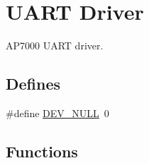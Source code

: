 \hypertarget{group___u_a_r_t___d_r_i_v_e_r}{
\section{UART Driver}
\label{group___u_a_r_t___d_r_i_v_e_r}
}
AP7000 UART driver.  


\subsection*{Defines}
\begin{CompactItemize}
\item 
\#define \hyperlink{group___u_a_r_t___d_r_i_v_e_r_g8a3ec48b54d63808ed4c386c320fed47}{DEV\_\-NULL}~0
\end{CompactItemize}
\subsection*{Functions}
